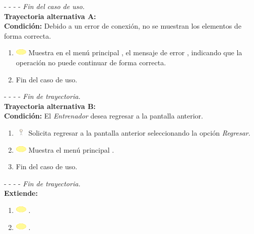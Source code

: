 - - - - \textit{Fin del caso de uso.} \\

\textbf{\large{Trayectoria alternativa A:}}\\
\textbf{Condición: } Debido a un error de conexión, no se muestran los elementos de forma correcta.

\begin{enumerate}
	\item \includegraphics[width=15pt]{./Figuras/iconosCU/herramienta.png} Muestra en el menú principal , el mensaje de error , indicando que la operación no puede continuar de forma correcta.
	\item Fin del caso de uso.
\end{enumerate}

- - - - \textit{Fin de trayectoria.} \\

\textbf{\large{Trayectoria alternativa B:}}\\
\textbf{Condición: } El \textit{Entrenador} desea regresar a la pantalla anterior.

\begin{enumerate}
	\item \includegraphics[width=15pt, height=10pt]{./Figuras/iconosCU/usuario.png} Solicita regresar a la pantalla anterior seleccionando la opción \textit{Regresar}.
	\item \includegraphics[width=15pt]{./Figuras/iconosCU/herramienta.png} Muestra el menú principal .
	\item Fin del caso de uso.
\end{enumerate}

- - - - \textit{Fin de trayectoria.} \\

\textbf{\large{Extiende:}}\\

\begin{enumerate}
	\item \includegraphics[width=15pt]{./Figuras/iconosCU/herramienta.png} .
	\item \includegraphics[width=15pt]{./Figuras/iconosCU/herramienta.png} .
\end{enumerate}
\clearpage